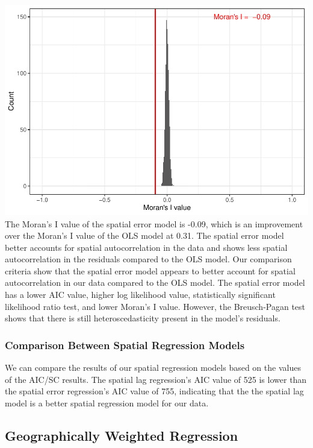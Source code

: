 \documentclass[
]{article}
\begin{document}
\includegraphics{HW2-SpatialRegression_files/figure-latex/unnamed-chunk-7-1.pdf}
The Moran's I value of the spatial error model is -0.09, which is an
improvement over the Moran's I value of the OLS model at 0.31. The
spatial error model better accounts for spatial autocorrelation in the
data and shows less spatial autocorrelation in the residuals compared to
the OLS model. Our comparison criteria show that the spatial error model
appears to better account for spatial autocorrelation in our data
compared to the OLS model. The spatial error model has a lower AIC
value, higher log likelihood value, statistically significant likelihood
ratio test, and lower Moran's I value. However, the Breusch-Pagan test
shows that there is still heteroscedasticity present in the model's
residuals.

\hypertarget{comparison-between-spatial-regression-models}{%
\subsubsection{Comparison Between Spatial Regression
Models}\label{comparison-between-spatial-regression-models}}

We can compare the results of our spatial regression models based on the
values of the AIC/SC results. The spatial lag regression's AIC value of
525 is lower than the spatial error regression's AIC value of 755,
indicating that the the spatial lag model is a better spatial regression
model for our data.

\hypertarget{geographically-weighted-regression}{%
\subsection{Geographically Weighted
Regression}\label{geographically-weighted-regression}}
\end{document}
